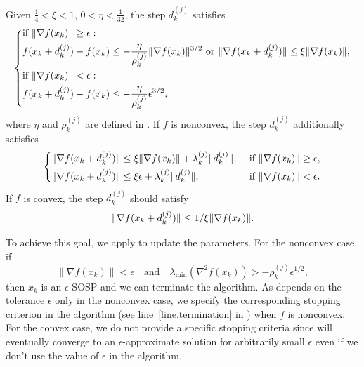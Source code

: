 \begin{property}
    \label{cond.modified function or gradient des}
    Given $\frac{1}{4}<\xi<1$, $0<\eta<\frac{1}{32}$, the step $d_k^{(j)}$ satisfies
    \begin{equation}\label{eq.property adaptive 1}
        \left\{
        \begin{aligned}
         &\text{if} \ \|\nabla f(x_k)\|\geq \epsilon:\\
            &f(x_k+d_k^{(j)})-f(x_k)  \leq -\frac{\eta}{\rho_k^{(j)}}\|\nabla f(x_k)\|^{3/2} \text{ or } \|\nabla f(x_k+d_k^{(j)})\|\leq \xi\|\nabla f(x_k)\|,\\
            &\text{if} \ \|\nabla f(x_k)\|<\epsilon:\\
            &f(x_k+d_k^{(j)})-f(x_k)  \leq -\frac{\eta}{\rho_k^{(j)}}\epsilon^{3/2},\    
        \end{aligned}
        \right.
    \end{equation}
    where $\eta$ and $\rho_k^{(j)}$ are defined in . If $f$ is nonconvex, the step $d_k^{(j)}$ additionally satisfies
        \begin{equation}
    \label{eq.property adaptive}
        \left\{
        \begin{aligned}
            &\|\nabla f(x_k+d_k^{(j)})\|\leq \xi\|\nabla f(x_k)\|+\lambda_k^{(j)}\|d_k^{(j)}\|, \ &  \text{if} \ \|\nabla f(x_k)\|\geq \epsilon, \\
            &\|\nabla f(x_k+d_k^{(j)})\|\leq \xi\epsilon+\lambda_k^{(j)}\|d_k^{(j)}\|,\                                                         & \text{if} \ \|\nabla f(x_k)\|<\epsilon.
        \end{aligned}
        \right.
    \end{equation}
    If $f$ is convex, the step $d_k^{(j)}$ should satisfy 
        \begin{equation}
        \label{eq.modified convex grad des}
        \|\nabla f(x_k+d_k^{(j)})\|\leq 1/\xi\|\nabla f(x_k)\|.
    \end{equation}
\end{property}
To achieve this goal, we apply  to update the parameters. For the nonconvex case, if 
\begin{equation}
    \label{eq.stopping sosps}
    \|\nabla f(x_k)\| <\epsilon \quad \text{and} \quad \lambda_{\min}(\nabla^2 f(x_k)) >-\rho_k^{(j)}\epsilon^{1/2},
\end{equation}
then $x_k$ is an $\epsilon$-SOSP and we can terminate the algorithm. As  depends on the tolerance $\epsilon$ only in the nonconvex case, we specify the corresponding stopping criterion in the algorithm (see line~\ref{line.termination} in ) when $f$ is nonconvex. For the convex case, we do not provide a specific stopping criteria since  will eventually converge to an $\epsilon$-approximate solution for arbitrarily small $\epsilon$ even if we don't use the value of $\epsilon$ in the algorithm.

